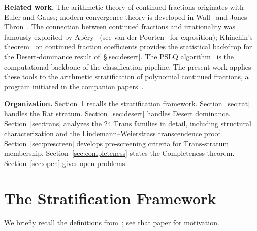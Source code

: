 \documentclass[12pt, reqno]{amsart}
\theoremstyle{definition}
\theoremstyle{remark}
\newcommand{\Rat}{\mathrm{Rat}}
\newcommand{\Trans}{\mathrm{Trans}}
\begin{document}
\textbf{Related work.}
The arithmetic theory of continued
fractions originates with Euler and Gauss; modern
convergence theory is developed in Wall~\cite{wall} and
Jones--Thron~\cite{jones_thron}. The connection between continued
fractions and irrationality was famously exploited
by Ap\'ery~\cite{apery} (see van der Poorten~\cite{vanderpoorten} for
exposition); Khinchin's theorem~\cite{khinchin_book} on continued
fraction coefficients provides the statistical
backdrop for the Desert-dominance result of~\S\ref{sec:desert}.
The PSLQ algorithm~\cite{ferguson_bailey} is the computational
backbone of the classification pipeline. The present
work applies these tools to the arithmetic
stratification of polynomial continued fractions,
a program initiated in the companion papers~\cite{contamination,logladder,psl2z,painleve}.

\textbf{Organization.}
Section~\ref{sec:framework} recalls the stratification framework.
Section~\ref{sec:rat} handles the $\Rat$ stratum.
Section~\ref{sec:desert} handles Desert dominance.
Section~\ref{sec:trans} analyzes the 24 $\Trans$ families in detail, including structural characterization
and the Lindemann--Weierstrass transcendence proof.
Section~\ref{sec:prescreen} develops
pre-screening criteria for $\Trans$-stratum membership.
Section~\ref{sec:completeness} states the
Completeness theorem.
Section~\ref{sec:open} gives open problems.


\section{The Stratification Framework}\label{sec:framework}

We briefly recall the definitions from~\cite{logladder}; see that paper for motivation.
\end{document}
